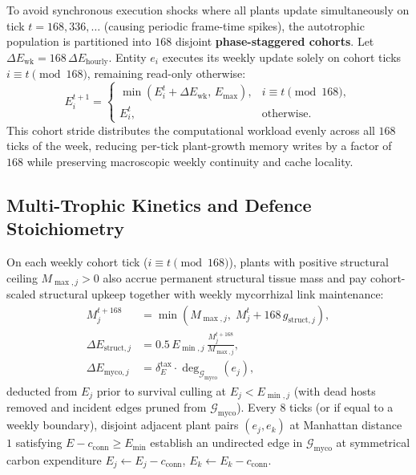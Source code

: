 To avoid synchronous execution shocks where all plants update simultaneously on tick $t = 168, 336, \dots$ (causing periodic frame-time spikes), the autotrophic population is partitioned into $168$ disjoint \textbf{phase-staggered cohorts}. Let $\Delta E_{\mathrm{wk}} = 168\,\Delta E_{\text{hourly}}$. Entity $e_i$ executes its weekly update solely on cohort ticks $i \equiv t \pmod{168}$, remaining read-only otherwise:
\begin{equation}
  E_{i}^{t+1} =
  \begin{cases}
    \min(E_i^t + \Delta E_{\mathrm{wk}},\, E_{\max}), & i \equiv t \pmod{168}, \\
    E_i^t, & \text{otherwise}.
  \end{cases}
  \label{eq:full_weekly_growth}
\end{equation}
This cohort stride distributes the computational workload evenly across all $168$ ticks of the week, reducing per-tick plant-growth memory writes by a factor of $168$ while preserving macroscopic weekly continuity and cache locality.

\subsection{Multi-Trophic Kinetics and Defence Stoichiometry}
\label{subsec:trophic_kinetics}

On each weekly cohort tick ($i \equiv t \pmod{168}$), plants with positive structural ceiling $M_{\max, j} > 0$ also accrue permanent structural tissue mass and pay cohort-scaled structural upkeep together with weekly mycorrhizal link maintenance:
\begin{align}
  M_j^{t+168} &= \min\!\left(M_{\max, j},\; M_j^t + 168\,g_{\text{struct}, j}\right), \nonumber \\
  \Delta E_{\text{struct}, j} &= 0.5\,E_{\min, j}\,\frac{M_j^{t+168}}{M_{\max, j}}, \nonumber \\
  \Delta E_{\text{myco}, j} &= \delta_E^{\text{tax}} \cdot \deg_{\mathcal{G}_{\text{myco}}}(e_j),
  \label{eq:structural_mass_growth}
\end{align}
deducted from $E_j$ prior to survival culling at $E_j < E_{\min, j}$ (with dead hosts removed and incident edges pruned from $\mathcal{G}_{\text{myco}}$). Every $8$ ticks (or if equal to a weekly boundary), disjoint adjacent plant pairs $(e_j, e_k)$ at Manhattan distance $1$ satisfying $E - c_{\text{conn}} \ge E_{\min}$ establish an undirected edge in $\mathcal{G}_{\text{myco}}$ at symmetrical carbon expenditure $E_j \gets E_j - c_{\text{conn}}$, $E_k \gets E_k - c_{\text{conn}}$.

